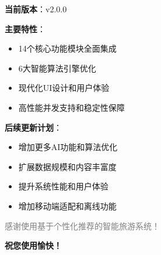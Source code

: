 \documentclass[12pt, a4paper]{article}
\begin{document}
\begin{successbox}[title={版本更新说明}]
\textbf{当前版本}：v2.0.0

\textbf{主要特性}：
\begin{itemize}[nosep]
    \item 14个核心功能模块全面集成
    \item 6大智能算法引擎优化
    \item 现代化UI设计和用户体验
    \item 高性能并发支持和稳定性保障
\end{itemize}

\textbf{后续更新计划}：
\begin{itemize}[nosep]
    \item 增加更多AI功能和算法优化
    \item 扩展数据规模和内容丰富度
    \item 提升系统性能和用户体验
    \item 增加移动端适配和离线功能
\end{itemize}
\end{successbox}

\vfill

\begin{center}
\textcolor{gray}{\large 感谢使用基于个性化推荐的智能旅游系统！}

\textcolor{secondary}{\textbf{祝您使用愉快！}}
\end{center}
\end{document}
